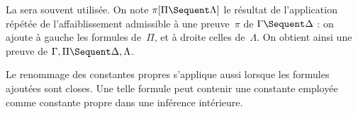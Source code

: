 \documentclass[../../../include/open-logic-section]{subfiles}
\begin{document}
La 
sera souvent utilisée. On note
$\pi[\Pi \Sequent \Lambda]$ le résultat
de l'application répétée de l'affaiblissement
admissible à une preuve~$\pi$ de
$\Gamma \Sequent \Delta$ : on ajoute
à gauche les formules de~$\Pi$, et à droite
celles de~$\Lambda$. On obtient ainsi une
preuve de $\Gamma, \Pi \Sequent \Delta, \Lambda$.

Le renommage des constantes propres s'applique aussi
lorsque les formules ajoutées sont closes. Une telle
formule peut contenir une constante employée comme
%
%
%
%
%
%
%
%
%
%
%
constante propre dans une inférence intérieure.
\end{document}
